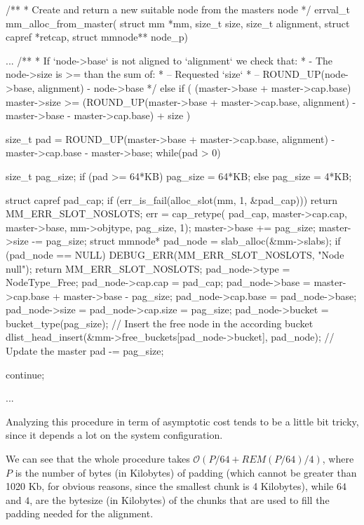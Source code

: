 \documentclass[a4paper,twoside,openright]{report}
\newcommand{\bigO}{\mathcal{O}}
\begin{document}
\begin{pandacode}
/**
 * Create and return a new suitable node from the masters node
 */
errval_t mm_alloc_from_master(
    struct mm *mm, 
    size_t size,
    size_t alignment,
    struct capref *retcap,
    struct mmnode** node_p) {
  ...
  /**
   * If `node->base` is not aligned to `alignment` we check that:
   * - The node->size is >= than the sum of:
   *   -- Requested `size`
   *   -- ROUND_UP(node->base, alignment) - node->base
   */
  else if (
      (master->base + master->cap.base) %
      master->size >= 
          (ROUND_UP(master->base + master->cap.base, alignment) 
          - master->base - master->cap.base) + size
      ) {
      size_t pad = ROUND_UP(master->base + master->cap.base, alignment) 
          - master->cap.base - master->base;
      while(pad > 0) {
        size_t pag_size;
        if (pad >= 64*KB) pag_size = 64*KB;
        else pag_size = 4*KB;
  
        struct capref pad_cap;
        if (err_is_fail(alloc_slot(mm, 1, &pad_cap))) {
            return MM_ERR_SLOT_NOSLOTS;
        }
        err = cap_retype(
            pad_cap,
            master->cap.cap,
            master->base,
            mm->objtype, pag_size, 1);
        master->base += pag_size;
        master->size -= pag_size;
        struct mmnode* pad_node = slab_alloc(&mm->slabs);
        if (pad_node == NULL) {
            DEBUG_ERR(MM_ERR_SLOT_NOSLOTS, "Node null");
            return MM_ERR_SLOT_NOSLOTS;
        }
        pad_node->type = NodeType_Free;
        pad_node->cap.cap = pad_cap;
        pad_node->base =  master->cap.base + master->base - pag_size;
        pad_node->cap.base = pad_node->base;
        pad_node->size = pad_node->cap.size = pag_size;
        pad_node->bucket = bucket_type(pag_size);
        // Insert the free node in the according bucket
        dlist_head_insert(&mm->free_buckets[pad_node->bucket], pad_node);
        // Update the master
        pad -= pag_size;
      }
      continue;
  }
  ...
}
\end{pandacode}
Analyzing this procedure in term of asymptotic cost tends to be a little bit tricky, since it depends a lot on the system configuration.

We can see that the whole procedure takes $\bigO(P/64 + REM(P/64) / 4)$, where $P$ is the number of bytes (in Kilobytes) of padding (which cannot be greater than 1020 Kb, for obvious reasons, since the smallest chunk is 4 Kilobytes), while $64$ and $4$, are the bytesize (in Kilobytes) of the chunks that are used to fill the padding needed for the alignment.
\end{document}
